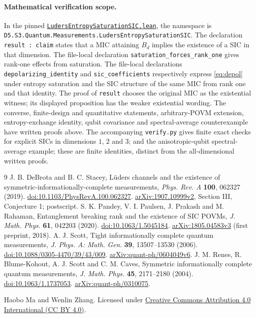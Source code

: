 \documentclass[11pt]{article}
\begin{document}
\paragraph{Mathematical verification scope.}
In the pinned
\href{https://github.com/the-omega-institute/trureturing/blob/0b9787cf2582188d0ab3da380adab3fa26bea39c/D5/S3/Quantum/Measurements/LudersEntropySaturationSIC.lean}{\texttt{LudersEntropySaturationSIC.lean}},
the namespace is
\texttt{D5.S3.Quantum.Measurements.}\allowbreak\texttt{LudersEntropySaturationSIC}.
The declaration \texttt{result : claim} states that a MIC attaining
$B_d$ implies the existence of a SIC in that dimension.
The file-local declaration \texttt{saturation\_forces\_rank\_one}
gives rank-one effects from saturation.
The file-local declarations \texttt{depolarizing\_identity} and
\texttt{sic\_coefficients} respectively express
\eqref{eq:depol} under entropy saturation and the SIC structure of the
same MIC from rank one and that identity.
The proof of \texttt{result} chooses the original MIC as the existential
witness; its displayed proposition has the weaker existential wording.
The converse, finite-design and quantitative statements, arbitrary-POVM
extension, entropy-exchange identity, qubit covariance and spectral-average counterexample
have written proofs above. The accompanying \texttt{verify.py} gives
finite exact checks for explicit SICs in dimensions $1$, $2$ and $3$;
and the anisotropic-qubit spectral-average example;
these are finite identities, distinct from the all-dimensional written proofs.

\begin{thebibliography}{9}
 J. B. DeBrota and B. C. Stacey,
L\"uders channels and the existence of symmetric-informationally-complete measurements,
\emph{Phys. Rev. A} \textbf{100}, 062327 (2019).
\href{https://doi.org/10.1103/PhysRevA.100.062327}{doi:10.1103/PhysRevA.100.062327}.
\href{https://arxiv.org/abs/1907.10999v2}{arXiv:1907.10999v2}, Section III, Conjecture 1; postscript.
 S. K. Pandey, V. I. Paulsen, J. Prakash and M. Rahaman,
Entanglement breaking rank and the existence of SIC POVMs,
\emph{J. Math. Phys.} \textbf{61}, 042203 (2020).
\href{https://doi.org/10.1063/1.5045184}{doi:10.1063/1.5045184}.
\href{https://arxiv.org/abs/1805.04583v3}{arXiv:1805.04583v3} (first preprint, 2018).
 A. J. Scott,
Tight informationally complete quantum measurements,
\emph{J. Phys. A: Math. Gen.} \textbf{39}, 13507--13530 (2006).
\href{https://doi.org/10.1088/0305-4470/39/43/009}{doi:10.1088/0305-4470/39/43/009}.
\href{https://arxiv.org/abs/quant-ph/0604049v6}{arXiv:quant-ph/0604049v6}.
 J. M. Renes, R. Blume-Kohout, A. J. Scott and C. M. Caves,
Symmetric informationally complete quantum measurements,
\emph{J. Math. Phys.} \textbf{45}, 2171--2180 (2004).
\href{https://doi.org/10.1063/1.1737053}{doi:10.1063/1.1737053}.
\href{https://arxiv.org/abs/quant-ph/0310075}{arXiv:quant-ph/0310075}.
\end{thebibliography}
\medskip
\noindent\small Haobo Ma and Wenlin Zhang. Licensed under
\href{https://creativecommons.org/licenses/by/4.0/}{Creative Commons Attribution 4.0 International (CC BY 4.0)}.
\end{document}
